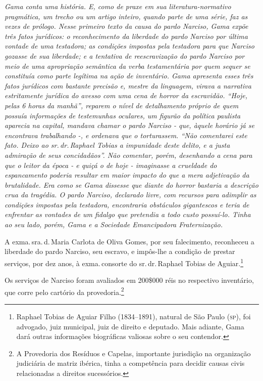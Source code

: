 \begin{didascalia}
\emph{Gama conta uma história. E, como de praxe em sua
literatura-normativo pragmática, um trecho ou um artigo inteiro, quando
parte de uma série, faz as vezes de prólogo. Nesse primeiro texto da
causa do pardo Narciso, Gama expõe três fatos jurídicos: o
reconhecimento da liberdade do pardo Narciso por última vontade de uma
testadora; as condições impostas pela testadora para que Narciso gozasse
de sua liberdade; e a tentativa de reescravização do pardo Narciso por
meio de uma apropriação semântica da verba testamentária por quem sequer
se constituía como parte legítima na ação de inventário. Gama apresenta
esses três fatos jurídicos com bastante precisão e, mestre da linguagem,
virava a narrativa estritamente jurídica do avesso com uma cena de
horror da escravidão. ``Hoje, pelas 6 horas da manhã'', reparem o nível de
detalhamento próprio de quem possuía informações de testemunhas
oculares, um figurão da política paulista aparecia na capital, mandava
chamar o pardo Narciso - que, àquele horário já se encontrava
trabalhando -, e ordenava que o torturassem. ``Não comentarei este fato.
Deixo ao sr.\,dr.\,Raphael Tobias a impunidade deste delito, e a justa
admiração de seus concidadãos''. Não comentar, porém, desenhando a cena
para que o leitor da época - e quiçá o de hoje - imaginasse a crueldade
do espancamento poderia resultar em maior impacto do que a mera
adjetivação da brutalidade. Era como se Gama dissesse que diante do
horror bastaria a descrição crua da tragédia. O pardo Narciso, declarado
livre, com recursos para adimplir as condições impostas pela testadora,
encontraria obstáculos gigantescos e teria de enfrentar as vontades de
um fidalgo que pretendia a todo custo possuí-lo. Tinha ao seu lado,
porém, Gama e a Sociedade Emancipadora Fraternização.}
\end{didascalia}


A exma.\,sra.\,d.\,Maria Carlota de Oliva Gomes, por seu falecimento,
reconheceu a liberdade do pardo Narciso, seu escravo, e impôs-lhe a
condição de prestar serviços, por dez anos, à exma.\,consorte do sr.\,dr.\,Raphael Tobias de Aguiar.\footnote{ Raphael Tobias de Aguiar Filho
  (1834--1891), natural de São Paulo (\textsc{sp}), foi advogado, juiz municipal,
  juiz de direito e deputado. Mais adiante, Gama dará outras informações
  biográficas valiosas sobre o seu contendor.}

Os serviços de Narciso foram avaliados em 200\$000 réis no respectivo
inventário, que corre pelo cartório da
provedoria.\footnote{ A Provedoria dos Resíduos e
  Capelas, importante jurisdição na organização judiciária de matriz
  ibérica, tinha a competência para decidir causas civis relacionadas a
  direitos sucessórios.}

